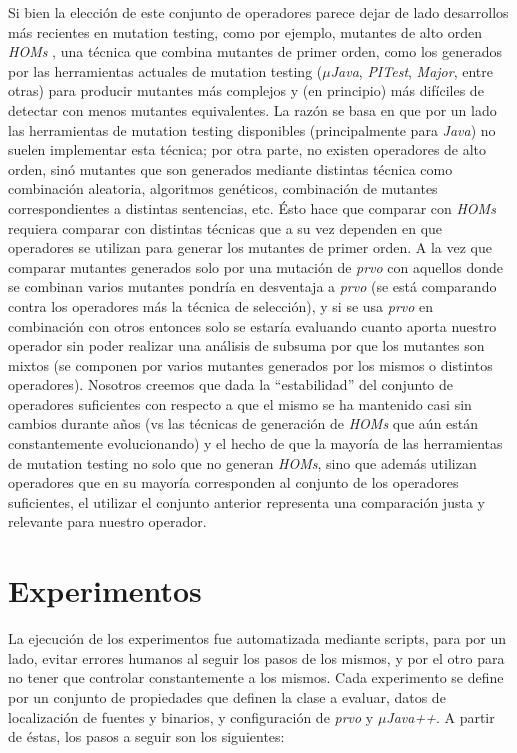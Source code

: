 Si bien la elecci\'on de este conjunto de operadores parece dejar de lado desarrollos m\'as recientes en mutation testing, como por ejemplo, mutantes de alto orden \emph{HOMs} \cite{bibliography.mutation.highorder.JiaH09}, una t\'ecnica que combina mutantes de primer orden, como los generados por las herramientas actuales de mutation testing (\emph{$\mu$Java}, \emph{PITest}, \emph{Major}, entre otras) para producir mutantes m\'as complejos y (en principio) m\'as dif\'iciles de detectar con menos mutantes equivalentes. La raz\'on se basa en que por un lado las herramientas de mutation testing disponibles (principalmente para \emph{Java}) no suelen implementar esta t\'ecnica; por otra parte, no existen operadores de alto orden, sin\'o mutantes que son generados mediante distintas t\'ecnica como combinaci\'on aleatoria, algoritmos gen\'eticos, combinaci\'on de mutantes correspondientes a distintas sentencias, etc. \'Esto hace que comparar con \emph{HOMs} requiera comparar con distintas t\'ecnicas que a su vez dependen en que operadores se utilizan para generar los mutantes de primer orden. A la vez que comparar mutantes generados solo por una mutaci\'on de \emph{prvo} con aquellos donde se combinan varios mutantes pondr\'ia en desventaja a \emph{prvo} (se est\'a comparando contra los operadores m\'as la t\'ecnica de selecci\'on), y si se usa \emph{prvo} en combinaci\'on con otros entonces solo se estar\'ia evaluando cuanto aporta nuestro operador sin poder realizar una an\'alisis de subsuma por que los mutantes son mixtos (se componen por varios mutantes generados por los mismos o distintos operadores). Nosotros creemos que dada la ``estabilidad'' del conjunto de operadores suficientes con respecto a que el mismo se ha mantenido casi sin cambios durante a\~nos (vs las t\'ecnicas de generaci\'on de \emph{HOMs} que a\'un est\'an constantemente evolucionando) y el hecho de que la mayor\'ia de las herramientas de mutation testing no solo que no generan \emph{HOMs}, sino que adem\'as utilizan operadores que en su mayor\'ia corresponden al conjunto de los operadores suficientes, el utilizar el conjunto anterior representa una comparaci\'on justa y relevante para nuestro operador.

\section{Experimentos}
\label{sec:evaluation.steps}

La ejecuci\'on de los experimentos fue automatizada mediante scripts, para por un lado, evitar errores humanos al seguir los pasos de los mismos, y por el otro para no tener que controlar constantemente a los mismos. Cada experimento se define por un conjunto de propiedades que definen la clase a evaluar, datos de localizaci\'on de fuentes y binarios, y configuraci\'on de \emph{prvo} y \emph{$\mu$Java++}. A partir de \'estas, los pasos a seguir son los siguientes:

